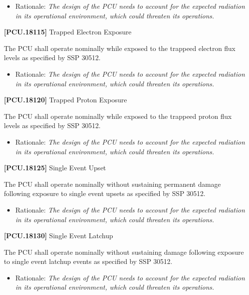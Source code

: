 \documentclass[12pt,oneside,oldfontcommands]{memoir}
\begin{document}
\begin{itemize}
\item{} Rationale: \emph{The design of the PCU needs to account for the expected radiation in its operational environment, which could threaten its operations.}

\end{itemize}

\textbf{[PCU.18115]} Trapped Electron Exposure

The \gls{PCU} shall operate nominally while exposed to the trappeed electron flux levels as specified by SSP 30512.

\begin{itemize}
\item{} Rationale: \emph{The design of the PCU needs to account for the expected radiation in its operational environment, which could threaten its operations.}

\end{itemize}

\textbf{[PCU.18120]} Trapped Proton Exposure

The \gls{PCU} shall operate nominally while exposed to the trappeed proton flux levels as specified by SSP 30512.

\begin{itemize}
\item{} Rationale: \emph{The design of the PCU needs to account for the expected radiation in its operational environment, which could threaten its operations.}

\end{itemize}

\textbf{[PCU.18125]} Single Event Upset

The \gls{PCU} shall operate nominally without sustaining permanent damage following exposure to single event upsets as specified by SSP 30512.

\begin{itemize}
\item{} Rationale: \emph{The design of the PCU needs to account for the expected radiation in its operational environment, which could threaten its operations.}

\end{itemize}

\textbf{[PCU.18130]} Single Event Latchup

The \gls{PCU} shall operate nominally without sustaining damage following exposure to single event latchup events as specified by SSP 30512.

\begin{itemize}
\item{} Rationale: \emph{The design of the PCU needs to account for the expected radiation in its operational environment, which could threaten its operations.}

\end{itemize}
\end{document}
